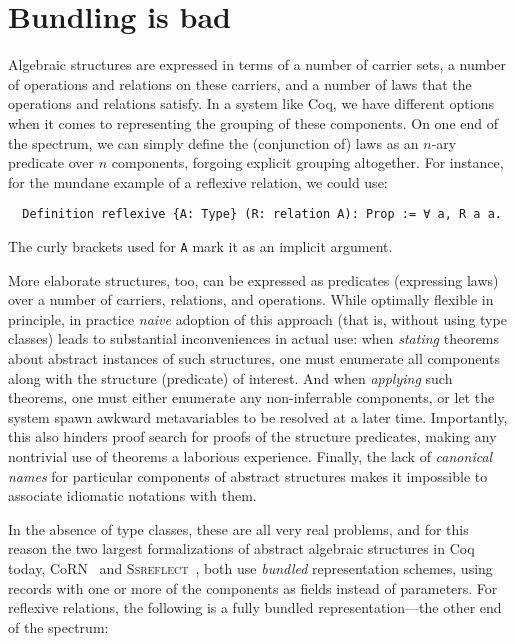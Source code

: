 \documentclass[a4paper,10pt,runningheads]{llncs}
\begin{document}
\section{Bundling is bad}\label{bundling}

Algebraic structures are expressed in terms of a number of carrier sets, a number of operations and relations on these carriers, and a number of laws that the operations and relations satisfy. In a system like Coq, we have different options when it comes to representing the grouping of these components. On one end of the spectrum, we can simply define the (conjunction of) laws as an $n$-ary predicate over $n$ components, forgoing explicit grouping altogether. For instance, for the mundane example of a reflexive relation, we could use:

\begin{lstlisting}
  Definition reflexive {A: Type} (R: relation A): Prop := ∀ a, R a a.
\end{lstlisting}
The curly brackets used for \lstinline|A| mark it as an implicit argument.

More elaborate structures, too, can be expressed as predicates (expressing laws) over a number of carriers, relations, and operations. While optimally flexible in principle, in practice \emph{naive} adoption of this approach (that is, without using type classes) leads to substantial inconveniences in actual use: when \emph{stating} theorems about abstract instances of such structures, one must enumerate all components along with the structure (predicate) of interest. And when \emph{applying} such theorems, one must either enumerate any non-inferrable components, or let the system spawn awkward metavariables to be resolved at a later time. Importantly, this also hinders proof search for proofs of the structure predicates, making any nontrivial use of theorems a laborious experience. Finally, the lack of \emph{canonical names} for particular components of abstract structures makes it impossible to associate idiomatic notations with them.

In the absence of type classes, these are all very real problems, and for this reason the two largest formalizations of abstract algebraic structures in Coq today, CoRN~\cite{C-corn} and \textsc{Ssreflect}~\cite{Packed}, both use \emph{bundled} representation schemes, using records with one or more of the components as fields instead of parameters. For reflexive relations, the following is a fully bundled representation---the other end of the spectrum:
\end{document}
